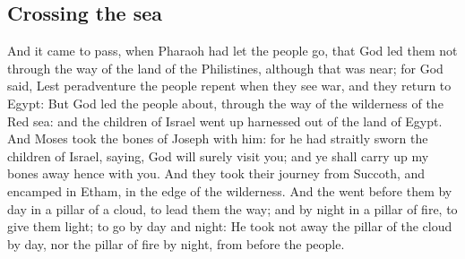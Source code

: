 \begin{biblechapter}
\section*{Crossing the sea}
\verse And it came to pass, when Pharaoh had let the people go, that God led them not through the way of the land of the Philistines, although that was near; for God said, Lest peradventure the people repent when they see war, and they return to Egypt:
\verse But God led the people about, through the way of the wilderness of the Red sea: and the children of Israel went up harnessed out of the land of Egypt.
\verse And Moses took the bones of Joseph with him: for he had straitly sworn the children of Israel, saying, God will surely visit you; and ye shall carry up my bones away hence with you.
\verse And they took their journey from Succoth, and encamped in Etham, in the edge of the wilderness.
\verse And the \LORD went before them by day in a pillar of a cloud, to lead them the way; and by night in a pillar of fire, to give them light; to go by day and night:
\verse He took not away the pillar of the cloud by day, nor the pillar of fire by night, from before the people.
\end{biblechapter}

